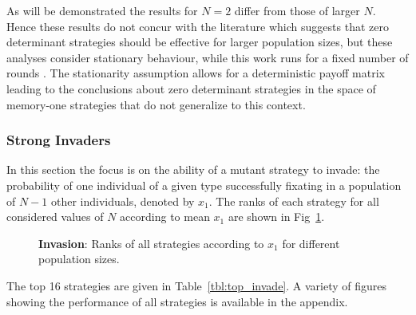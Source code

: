 \documentclass[10pt,letterpaper]{article}
\begin{document}
As will be demonstrated the results for
\(N=2\) differ from those of larger $N$. Hence these results do not concur with
the literature which suggests that zero determinant strategies should be
effective for larger population sizes, but these analyses consider stationary
behaviour, while this work runs for a fixed number of rounds \cite{stewart2013extortion}.
The stationarity assumption allows for a deterministic payoff matrix
leading to the conclusions about zero determinant strategies in the space
of memory-one strategies that do not generalize to this context.

\subsubsection*{Strong Invaders}

In this section the focus is on the ability of a mutant strategy to invade: the
probability of one individual of a given type successfully fixating in a
population of \(N - 1\) other individuals, denoted by \(x_1\). The ranks of each
strategy for all considered values of \(N\) according to mean \(x_1\) are shown
in Fig~\ref{fig:ranks_v_size_invade}.

\begin{figure}[!hbtp]
    \centering
    \caption{\textbf{Invasion}: Ranks of all strategies according to \(x_1\) for different population sizes.}
    \label{fig:ranks_v_size_invade}
\end{figure}

The top 16 strategies are given in Table~\ref{tbl:top_invade}. A variety of
figures showing the performance of all strategies is available in the
appendix.
\end{document}
